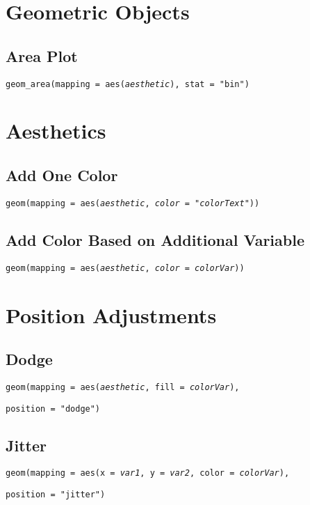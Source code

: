 \documentclass{tufte-handout}
\begin{document}
\vspace{5mm}
\section{Geometric Objects}
\subsection{Area Plot}
{\color{red}\texttt{geom\_area}}\texttt{(mapping = aes(\textit{aesthetic}), stat = "bin")}

\vspace{5mm}
\section{Aesthetics}
\subsection{Add One Color}
{\color{red}\texttt{geom}}\texttt{(mapping = aes(\textit{aesthetic}, \textit{color} = "\textit{colorText}"))}

\vspace{3mm}
\subsection{Add Color Based on Additional Variable}
{\color{red}\texttt{geom}}\texttt{(mapping = aes(\textit{aesthetic}, \textit{color} = \textit{colorVar}))}

\vspace{5mm}
\section{Position Adjustments}
\subsection{Dodge}
{\color{red}\texttt{geom}}\texttt{(mapping = aes(\textit{aesthetic}, fill = \textit{colorVar}),}
\par \noindent \hspace{5mm} \texttt{position = "dodge")}

\vspace{3mm}
\subsection{Jitter}
{\color{red}\texttt{geom}}\texttt{(mapping = aes(x = \textit{var1}, y = \textit{var2}, color = \textit{colorVar}),}
\par \noindent \hspace{5mm} \texttt{position = "jitter")}
\end{document}
